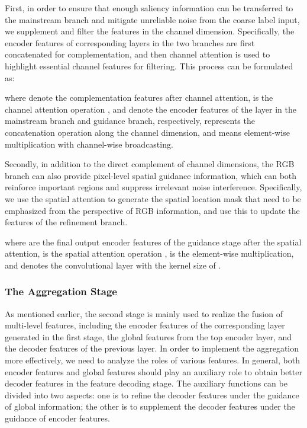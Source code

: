 \documentclass[journal]{IEEEtran}
\begin{document}
First, in order to ensure that enough saliency information can be transferred to the mainstream branch and mitigate unreliable noise from the coarse label input, we supplement and filter the features in the channel dimension. Specifically, the encoder features of corresponding layers in the two branches are first concatenated for complementation, and then channel attention is used to highlight essential channel features for filtering. This process can be formulated as:

where  denote the complementation features after channel attention,  is the channel attention operation \cite{ca},  and  denote the encoder features of the  layer in the mainstream branch and guidance branch, respectively,   represents the concatenation operation along the channel dimension,
and  means element-wise multiplication with channel-wise broadcasting.

Secondly, in addition to the direct complement of channel dimensions, the RGB branch can also provide pixel-level spatial guidance information, which can both reinforce important regions and suppress irrelevant noise interference.
Specifically, we use the spatial attention \cite{sa} to generate the spatial location mask that need to be emphasized from the perspective of RGB information, and use this to update the features of the refinement branch.

where  are the final output encoder features of the guidance stage after the spatial attention,  is the spatial attention operation \cite{DBLP:conf/eccv/WooPLK18},   is the element-wise multiplication, and  denotes the convolutional layer with the kernel size of .






\subsubsection{The Aggregation Stage}
As mentioned earlier, the second stage is mainly used to realize the fusion of multi-level features, including the encoder features of the corresponding layer generated in the first stage, the global features from the top encoder layer, and the decoder features of the previous layer.
In order to implement the aggregation more effectively, we need to analyze the roles of various features. In general, both encoder features and global features should play an auxiliary role to obtain better decoder features in the feature decoding stage.
The auxiliary functions can be divided into two aspects: one is to refine the decoder features under the guidance of global information; the other is to supplement the decoder features under the guidance of encoder features.
\end{document}
